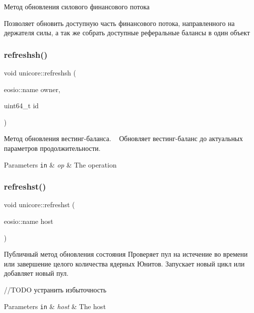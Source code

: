 Метод обновления силового финансового потока 

Позволяет обновить доступную часть финансового потока, направленного на держателя силы, а так же собрать доступные реферальные балансы в один объект \mbox{\label{classunicore_a790c1a22331df2bd9e7f9b9094de7dfb}} 
\subsubsection{\texorpdfstring{refreshsh()}{refreshsh()}}
{\footnotesize\ttfamily void unicore\+::refreshsh (\begin{DoxyParamCaption}\item[{eosio\+::name}]{owner,  }\item[{uint64\+\_\+t}]{id }\end{DoxyParamCaption})}



Метод обновления вестинг-\/баланса. ~\newline
Обновляет вестинг-\/баланс до актуальных параметров продолжительности. 


\begin{DoxyParams}[1]{Parameters}
\mbox{\tt in}  & {\em op} & The operation \\
\hline
\end{DoxyParams}
\mbox{\label{classunicore_a2a410729955a5bc11fe3b3051f10a4c9}} 
\subsubsection{\texorpdfstring{refreshst()}{refreshst()}}
{\footnotesize\ttfamily void unicore\+::refreshst (\begin{DoxyParamCaption}\item[{eosio\+::name}]{host }\end{DoxyParamCaption})}



Публичный метод обновления состояния Проверяет пул на истечение во времени или завершение целого количества ядерных Юнитов. Запускает новый цикл или добавляет новый пул. 

//\+T\+O\+DO устранить избыточность


\begin{DoxyParams}[1]{Parameters}
\mbox{\tt in}  & {\em host} & The host \\
\hline
\end{DoxyParams}
\mbox{\label{classunicore_ac0e6bf94b8bfd28e08c364631a357d91}} 
